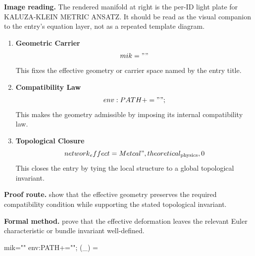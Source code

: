 \begin{samepage}
\noindent\begin{minipage}[t]{0.45\linewidth}
\vspace{0pt}
\raggedright
\scriptsize\textbf{Image reading.} The rendered manifold at right is the per-ID light plate for KALUZA-KLEIN METRIC ANSATZ. It should be read as the visual companion to the entry's equation layer, not as a repeated template diagram.\par
\end{minipage}\hfill
\begin{minipage}[t]{0.53\linewidth}
\vspace*{-0.10in}
\raggedright
{}
\end{minipage}
\end{samepage}

\clearpage


\begin{enumerate}[leftmargin=1.6em,itemsep=9pt,topsep=6pt]
\item \textbf{Geometric Carrier}
\[
mik=""
\]
This fixes the effective geometry or carrier space named by the entry title.

\item \textbf{Compatibility Law}
\[
env:PATH+="";
\]
This makes the geometry admissible by imposing its internal compatibility law.

\item \textbf{Topological Closure}
\[
network\\_effect = Metcal",theoretical_{\mathrm{physics}},0
\]
This closes the entry by tying the local structure to a global topological invariant.
\end{enumerate}

\textbf{Proof route.} show that the effective geometry preserves the required compatibility condition while supporting the stated topological invariant.

\textbf{Formal method.} prove that the effective deformation leaves the relevant Euler characteristic or bundle invariant well-defined.

\medskip
{}

\begin{tzpsnapshot}
\end{tzpsnapshot}

\tzpequationlinks
  {mik=""}
  {env:PATH+="";}
  {\chi(_{}) = \cdots}
